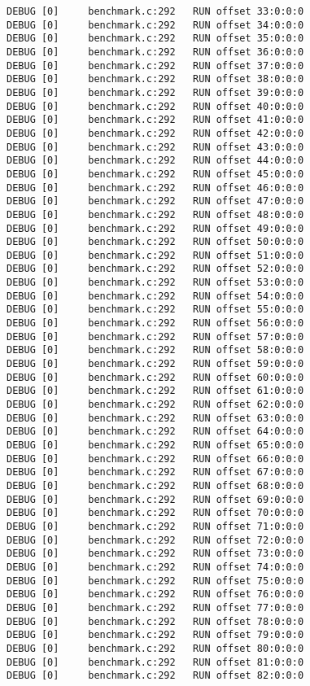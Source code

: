 \begin{verbatim}
DEBUG [0]     benchmark.c:292   RUN offset 33:0:0:0
DEBUG [0]     benchmark.c:292   RUN offset 34:0:0:0
DEBUG [0]     benchmark.c:292   RUN offset 35:0:0:0
DEBUG [0]     benchmark.c:292   RUN offset 36:0:0:0
DEBUG [0]     benchmark.c:292   RUN offset 37:0:0:0
DEBUG [0]     benchmark.c:292   RUN offset 38:0:0:0
DEBUG [0]     benchmark.c:292   RUN offset 39:0:0:0
DEBUG [0]     benchmark.c:292   RUN offset 40:0:0:0
DEBUG [0]     benchmark.c:292   RUN offset 41:0:0:0
DEBUG [0]     benchmark.c:292   RUN offset 42:0:0:0
DEBUG [0]     benchmark.c:292   RUN offset 43:0:0:0
DEBUG [0]     benchmark.c:292   RUN offset 44:0:0:0
DEBUG [0]     benchmark.c:292   RUN offset 45:0:0:0
DEBUG [0]     benchmark.c:292   RUN offset 46:0:0:0
DEBUG [0]     benchmark.c:292   RUN offset 47:0:0:0
DEBUG [0]     benchmark.c:292   RUN offset 48:0:0:0
DEBUG [0]     benchmark.c:292   RUN offset 49:0:0:0
DEBUG [0]     benchmark.c:292   RUN offset 50:0:0:0
DEBUG [0]     benchmark.c:292   RUN offset 51:0:0:0
DEBUG [0]     benchmark.c:292   RUN offset 52:0:0:0
DEBUG [0]     benchmark.c:292   RUN offset 53:0:0:0
DEBUG [0]     benchmark.c:292   RUN offset 54:0:0:0
DEBUG [0]     benchmark.c:292   RUN offset 55:0:0:0
DEBUG [0]     benchmark.c:292   RUN offset 56:0:0:0
DEBUG [0]     benchmark.c:292   RUN offset 57:0:0:0
DEBUG [0]     benchmark.c:292   RUN offset 58:0:0:0
DEBUG [0]     benchmark.c:292   RUN offset 59:0:0:0
DEBUG [0]     benchmark.c:292   RUN offset 60:0:0:0
DEBUG [0]     benchmark.c:292   RUN offset 61:0:0:0
DEBUG [0]     benchmark.c:292   RUN offset 62:0:0:0
DEBUG [0]     benchmark.c:292   RUN offset 63:0:0:0
DEBUG [0]     benchmark.c:292   RUN offset 64:0:0:0
DEBUG [0]     benchmark.c:292   RUN offset 65:0:0:0
DEBUG [0]     benchmark.c:292   RUN offset 66:0:0:0
DEBUG [0]     benchmark.c:292   RUN offset 67:0:0:0
DEBUG [0]     benchmark.c:292   RUN offset 68:0:0:0
DEBUG [0]     benchmark.c:292   RUN offset 69:0:0:0
DEBUG [0]     benchmark.c:292   RUN offset 70:0:0:0
DEBUG [0]     benchmark.c:292   RUN offset 71:0:0:0
DEBUG [0]     benchmark.c:292   RUN offset 72:0:0:0
DEBUG [0]     benchmark.c:292   RUN offset 73:0:0:0
DEBUG [0]     benchmark.c:292   RUN offset 74:0:0:0
DEBUG [0]     benchmark.c:292   RUN offset 75:0:0:0
DEBUG [0]     benchmark.c:292   RUN offset 76:0:0:0
DEBUG [0]     benchmark.c:292   RUN offset 77:0:0:0
DEBUG [0]     benchmark.c:292   RUN offset 78:0:0:0
DEBUG [0]     benchmark.c:292   RUN offset 79:0:0:0
DEBUG [0]     benchmark.c:292   RUN offset 80:0:0:0
DEBUG [0]     benchmark.c:292   RUN offset 81:0:0:0
DEBUG [0]     benchmark.c:292   RUN offset 82:0:0:0

\end{verbatim}

